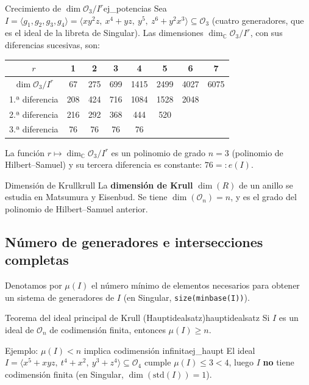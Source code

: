 \documentclass[11pt,a4paper]{article}
\begin{document}
\begin{observacion}{Crecimiento de $\dim \mathcal{O}_3/I^r$}{ej_potencias}
Sea $I = \langle g_1, g_2, g_3, g_4 \rangle = \langle xy^2z,\ x^4 + yz,\ y^5,\ z^6 + y^2x^3 \rangle \subseteq \mathcal{O}_3$ (cuatro generadores, que es el ideal de la libreta de Singular). Las dimensiones $\dim_{\mathbb{C}} \mathcal{O}_3 / I^r$, con sus diferencias sucesivas, son:
\begin{center}
\begin{tabular}{c|ccccccc}
$r$ & 1 & 2 & 3 & 4 & 5 & 6 & 7 \\ \hline
$\dim \mathcal{O}_3/I^r$ & 67 & 275 & 699 & 1415 & 2499 & 4027 & 6075 \\
1.ª diferencia & \multicolumn{1}{c}{208} & 424 & 716 & 1084 & 1528 & 2048 & \\
2.ª diferencia & 216 & 292 & 368 & 444 & 520 & & \\
3.ª diferencia & 76 & 76 & 76 & 76 & & &
\end{tabular}
\end{center}
La función $r \mapsto \dim_{\mathbb{C}} \mathcal{O}_3/I^r$ es un polinomio de grado $n = 3$ (polinomio de Hilbert--Samuel) y su tercera diferencia es constante: $76 =: e(I)$.
\end{observacion}

\begin{nota}{Dimensión de Krull}{krull}
La \textbf{dimensión de Krull} $\dim(R)$ de un anillo se estudia en Matsumura y Eisenbud. Se tiene $\dim(\mathcal{O}_n) = n$, y es el grado del polinomio de Hilbert--Samuel anterior.
\end{nota}

\subsection*{Número de generadores e intersecciones completas}

Denotamos por $\mu(I)$ el número mínimo de elementos necesarios para obtener un sistema de generadores de $I$ (en Singular, \texttt{size(minbase(I))}).

\begin{teorema}{Teorema del ideal principal de Krull (Hauptidealsatz)}{hauptidealsatz}
Si $I$ es un ideal de $\mathcal{O}_n$ de codimensión finita, entonces $\mu(I) \ge n$.
\end{teorema}

\begin{observacion}{Ejemplo: $\mu(I) < n$ implica codimensión infinita}{ej_haupt}
El ideal $I = \langle x^5 + xyz,\ t^4 + x^2,\ y^3 + z^4 \rangle \subseteq \mathcal{O}_4$ cumple $\mu(I) \le 3 < 4$, luego $I$ \textbf{no} tiene codimensión finita (en Singular, $\dim(\mathrm{std}(I)) = 1$).
\end{observacion}
\end{document}
